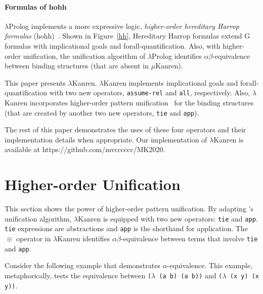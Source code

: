 \documentclass[acmlarge,review]{acmart}
\theoremstyle{definition}
\begin{document}
\paragraph{Formulas of hohh}
$\lambda$Prolog implements a more expressive logic, \emph{higher-order
  hereditary Harrop formulas} (hohh)~\citep{miller_hereditary_1987}.
Shown in Figure~\ref{hh}, Hereditary Harrop formulas extend G formulas
with implicational goals and forall-quantification. Also, with higher-order
unification, the unification algorithm of $\lambda$Prolog identifies
$\alpha\beta$-equivalence between binding structures
(that are absent in $\mu$Kanren).

This paper presents $\lambda$Kanren.
$\lambda$Kanren implements implicational goals and forall-quantification with
two new operators, \texttt{assume-rel} and \texttt{all}, respectively.
Also, $\lambda$Kanren incorporates higher-order pattern
unification~\citep{miller_logic_1991} for the binding structures
(that are created by another two new operators, \texttt{tie} and \texttt{app}).


The rest of this paper demonstrates the uses of these four operators
and their implementation details when appropriate.
Our implementation of $\lambda$Kanren is available at
https://github.com/mvcccccc/MK2020.

\section{Higher-order Unification}
This section shows the power of higher-order pattern unification.
By adapting \citet{miller_logic_1991}'s unification algorithm, $\lambda$Kanren
is equipped with two new operators: \texttt{tie} and \texttt{app}.
\texttt{tie} expressions are abstractions and \texttt{app} is the
shorthand for application.
The $\equiv$ operator in $\lambda$Kanren identifies
$\alpha\beta$-equivalence between terms that involve
\texttt{tie} and \texttt{app}.

Consider the following example that demonstrates $\alpha$-equivalence.
This example, metaphorically, tests the equivalence between
\texttt{($\lambda$ (a b) (a b))} and \texttt{($\lambda$ (x y) (x y))}.
\end{document}
